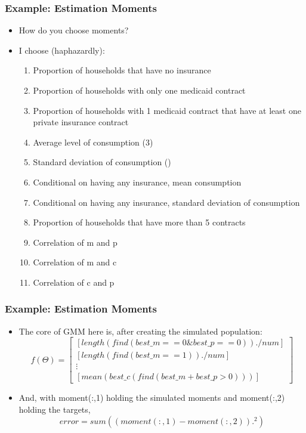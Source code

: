 \documentclass{beamer}
\begin{document}
\begin{frame}
\frametitle{Example: Estimation Moments}
\begin{itemize}
\item How do you choose moments?
\bigskip
\item I choose (haphazardly):
\begin{enumerate}
\item Proportion of households that have no insurance
\item Proportion of households with only one medicaid contract
\item Proportion of households with 1 medicaid contract that have at least one private insurance contract
\item Average level of consumption (3)
\item Standard deviation of consumption ()
\item Conditional on having any insurance, mean consumption
\item Conditional on having any insurance, standard deviation of consumption
\item Proportion of households that have more than 5 contracts
\item Correlation of m and p
\item Correlation of m and c
\item Correlation of c and p
\end{enumerate}
\end{itemize}
\end{frame}

\begin{frame}
\frametitle{Example: Estimation Moments}
\begin{itemize}
\item The core of GMM here is, after creating the simulated population:
 $$f(\Theta)=\left[\begin{array}{c}\left[length(find(best\_m==0 \& best\_p == 0))./num \right] \\ \left[length(find(best\_m==1))./num\right] \\  \vdots \\ \left[mean(best\_c(find(best\_m+best\_p>0)))\right] \end{array}\right]$$
 \item And, with moment(:,1) holding the simulated moments and moment(:,2) holding the targets,
 $$error = sum((moment(:,1)-moment(:,2)).^2)$$
 \end{itemize}
\end{frame}
\end{document}
